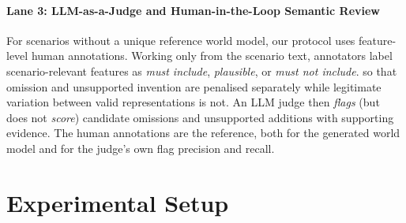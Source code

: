 \documentclass{article}
\begin{document}
\paragraph{Lane 3: LLM-as-a-Judge and Human-in-the-Loop Semantic Review}


For scenarios without a unique reference world model, our protocol uses feature-level human annotations. Working only from the scenario text, annotators label scenario-relevant features as \textit{must include}, \textit{plausible}, or \textit{must not include}. so that omission and unsupported invention are penalised separately while legitimate variation between valid representations is not. An LLM judge then {\em flags} (but does not {\em score}) candidate omissions and unsupported additions with supporting evidence. The human annotations are the reference, both for the generated world model and for the judge's own flag precision and recall.

\section{Experimental Setup}
\label{sec:setup}
\end{document}
